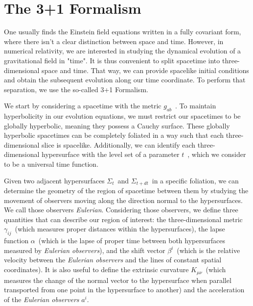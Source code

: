 \section{The 3+1 Formalism}
\label{section:3+1_formalism}

One usually finds the Einstein field equations written in a fully covariant form, where there isn't a clear distinction between space and time. However, in numerical relativity, we are interested in studying the dynamical evolution of a gravitational field in "time". It is thus convenient to split spacetime into three-dimensional space and time. That way, we can provide spacelike initial conditions and obtain the subsequent evolution along our time coordinate. To perform that separation, we use the so-called 3+1 Formalism.

We start by considering a spacetime with the metric $g_{ab}$~. To maintain hyperbolicity in our evolution equations, we must restrict our spacetimes to be globally hyperbolic, meaning they possess a Cauchy surface. These globally hyperbolic spacetimes can be completely foliated in a way such that each three-dimensional slice is spacelike. Additionally, we can identify each three-dimensional hypersurface with the level set of a parameter $t$~, which we consider to be a universal time function. 

Given two adjacent hypersurfaces $\Sigma_t$~and $\Sigma_{t+dt}$~in a specific foliation, we can determine the geometry of the region of spacetime between them by studying the movement of observers moving along the direction normal to the hypersurfaces. We call those observers \textit{Eulerian}. Considering those observers, we define three quantities that can describe our region of interest: the three-dimensional metric $\gamma_{ij}$~(which measures proper distances within the hypersurfaces), the lapse function $\alpha$~(which is the lapse of proper time between both hypersurfaces measured by \textit{Eulerian observers}), and the shift vector $\beta^i$~(which is the relative velocity between the \textit{Eulerian observers} and the lines of constant spatial coordinates). It is also useful to define the extrinsic curvature $K_{\mu\nu}$~(which measures the change of the normal vector to the hypersurface when parallel transported from one point in the hypersurface to another) and the acceleration of the \textit{Eulerian observers} $a^i$.

